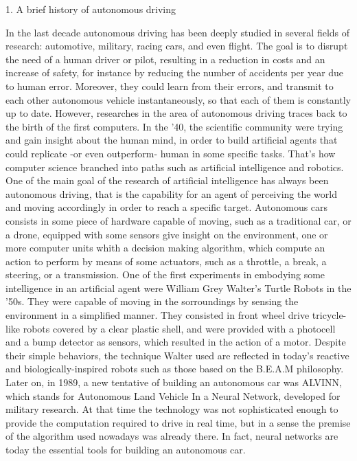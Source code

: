 1. A brief history of autonomous driving

In the last decade autonomous driving has been deeply studied in several fields of research: automotive, military, racing cars, and even flight. The goal is to disrupt the need of a human driver or pilot, resulting in a reduction in costs and an increase of safety, for instance by reducing the number of accidents per year due to human error. Moreover, they could learn from their errors, and transmit to each other autonomous vehicle instantaneously, so that each of them is constantly up to date.
However, researches in the area of autonomous driving traces back to the birth of the first computers. In the '40, the scientific community were trying and gain insight about the human mind, in order to build artificial agents that could replicate -or even outperform- human in some specific tasks.
That's how computer science branched into paths such as artificial intelligence and robotics.
One of the main goal of the research of artificial intelligence has always been autonomous driving, that is the capability for an agent of perceiving the world and moving accordingly in order to reach a specific target.
Autonomous cars consists in some piece of hardware capable of moving, such as a traditional car, or a drone, equipped with some sensors give insight on the environment, one or more computer units whith a decision making algorithm, which compute an action to perform by means of some actuators, such as a throttle, a break, a steering, or a transmission.
One of the first experiments in embodying some intelligence in an artificial agent were William Grey Walter's Turtle Robots in the '50s. They were capable of moving in the sorroundings by sensing the environment in a simplified manner. They consisted in front wheel drive tricycle-like robots covered by a clear plastic shell, and were provided with a photocell and a bump detector as sensors, which resulted in the action of a motor. Despite their simple behaviors, the technique Walter used are reflected in today's reactive and biologically-inspired robots such as those based on the B.E.A.M philosophy.
Later on, in 1989, a new tentative of building an autonomous car was ALVINN, which stands for Autonomous Land Vehicle In a Neural Network, developed for military research.
At that time the technology was not sophisticated enough to provide the computation required to drive in real time, but in a sense the premise of the algorithm used nowadays was already there. In fact, neural networks are today the essential tools for building an autonomous car.

